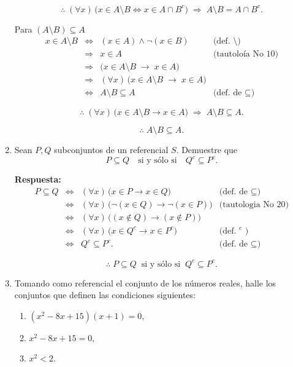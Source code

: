 \documentclass[12pt,letterpaper]{exam}
\begin{document}
\begin{enumerate}
\[
\therefore\; (\forall x)\,\big(x\in A\setminus B \iff x\in A\cap B^{c}\big)
\;\Rightarrow\; A\setminus B = A\cap B^{c}.
\]

Para $(A\setminus B)\subseteq A$
\[
\begin{array}{rcll}
x\in A\setminus B
&\iff& (x\in A)\land\neg(x\in B) & \text{(def.\ $\setminus$)}\\[2pt]
&\Rightarrow& x\in A & \text{(tautoloía No 10)}\\[2pt]
&\Rightarrow& \big(x\in A\setminus B \;\to\; x\in A\big)\\[2pt]
&\Rightarrow& (\forall x)\,\big(x\in A\setminus B \;\to\; x\in A\big)\\[2pt]
&\iff& A\setminus B \subseteq A & \text{(def.\ de $\subseteq$)}
\end{array}
\]

\[
\therefore\; (\forall x)\,\big(x\in A\setminus B \to x\in A\big)
\;\Rightarrow\; A\setminus B \subseteq A.
\]

\[
\therefore\; A\setminus B \subseteq A.
\]


    \item Sean $P,Q$ subconjuntos de un referencial $S$. Demuestre que
    \[
    P\subseteq Q \quad \text{si y sólo si} \quad Q^{c}\subseteq P^{c}.
    \]

    \textbf{Respuesta:}
\[
\begin{array}{rcll}
P\subseteq Q
&\iff& (\forall x)\,\big(x\in P \to x\in Q\big) & \text{(def.\ de $\subseteq$)}\\[2pt]
&\iff& (\forall x)\,\big(\neg(x\in Q) \to \neg(x\in P)\big) & \text{(tautologia No 20)}\\[2pt]
&\iff& (\forall x)\,\big((x\notin Q) \to (x\notin P)\big) \\
&\iff& (\forall x)\,\big(x\in Q^{c} \to x\in P^{c}\big) & \text{(def.\ $^{c}$ )}\\[2pt]
&\iff& Q^{c}\subseteq P^{c}. & \text{(def.\ de $\subseteq$)}
\end{array}
\]

\[
\therefore\; P\subseteq Q \;\;\text{si y sólo si}\;\; Q^{c}\subseteq P^{c}.
\]

    
    \item Tomando como referencial el conjunto de los números reales, halle los conjuntos que definen   las condiciones siguientes:
    \begin{enumerate}[label=\alph*)]
      \item $(x^{2}-8x+15)(x+1)=0,$
      \item $x^{2}-8x+15=0,$
      \item $x^{2}<2.$
    \end{enumerate}


\end{enumerate}
\end{document}
